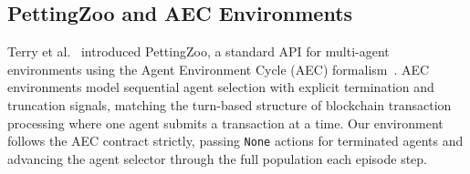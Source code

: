 \subsection{PettingZoo and AEC Environments}

Terry et al.~\cite{terry2021pettingzoo} introduced PettingZoo, a standard
API for multi-agent environments using the Agent Environment Cycle (AEC)
formalism~\cite{liu2019aec}.  AEC environments model sequential agent
selection with explicit termination and truncation signals, matching the
turn-based structure of blockchain transaction processing where one agent
submits a transaction at a time.  Our environment follows the AEC contract
strictly, passing \texttt{None} actions for terminated agents and advancing
the agent selector through the full population each episode step.
